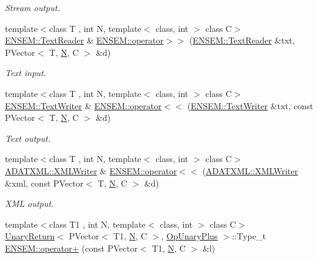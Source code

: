 \begin{DoxyCompactItemize}
\begin{DoxyCompactList}\small\item\em Stream output. \end{DoxyCompactList}\item 
{\footnotesize template$<$class T , int N, template$<$ class, int $>$ class C$>$ }\\\mbox{\hyperlink{classENSEM_1_1TextReader}{E\+N\+S\+E\+M\+::\+Text\+Reader}} \& \mbox{\hyperlink{group__primvector_gae8999766af04f54e1142ab8717a7f742}{E\+N\+S\+E\+M\+::operator$>$$>$}} (\mbox{\hyperlink{classENSEM_1_1TextReader}{E\+N\+S\+E\+M\+::\+Text\+Reader}} \&txt, P\+Vector$<$ T, \mbox{\hyperlink{adat__devel_2lib_2hadron_2operator__name__util_8cc_a7722c8ecbb62d99aee7ce68b1752f337}{N}}, C $>$ \&d)
\begin{DoxyCompactList}\small\item\em Text input. \end{DoxyCompactList}\item 
{\footnotesize template$<$class T , int N, template$<$ class, int $>$ class C$>$ }\\\mbox{\hyperlink{classENSEM_1_1TextWriter}{E\+N\+S\+E\+M\+::\+Text\+Writer}} \& \mbox{\hyperlink{group__primvector_gad4763d04d040319fe22a95ca0e2b8932}{E\+N\+S\+E\+M\+::operator$<$$<$}} (\mbox{\hyperlink{classENSEM_1_1TextWriter}{E\+N\+S\+E\+M\+::\+Text\+Writer}} \&txt, const P\+Vector$<$ T, \mbox{\hyperlink{adat__devel_2lib_2hadron_2operator__name__util_8cc_a7722c8ecbb62d99aee7ce68b1752f337}{N}}, C $>$ \&d)
\begin{DoxyCompactList}\small\item\em Text output. \end{DoxyCompactList}\item 
{\footnotesize template$<$class T , int N, template$<$ class, int $>$ class C$>$ }\\\mbox{\hyperlink{classADATXML_1_1XMLWriter}{A\+D\+A\+T\+X\+M\+L\+::\+X\+M\+L\+Writer}} \& \mbox{\hyperlink{group__primvector_ga5f643f72b00ff82d7abfb2a42401c045}{E\+N\+S\+E\+M\+::operator$<$$<$}} (\mbox{\hyperlink{classADATXML_1_1XMLWriter}{A\+D\+A\+T\+X\+M\+L\+::\+X\+M\+L\+Writer}} \&xml, const P\+Vector$<$ T, \mbox{\hyperlink{adat__devel_2lib_2hadron_2operator__name__util_8cc_a7722c8ecbb62d99aee7ce68b1752f337}{N}}, C $>$ \&d)
\begin{DoxyCompactList}\small\item\em X\+ML output. \end{DoxyCompactList}\item 
{\footnotesize template$<$class T1 , int N, template$<$ class, int $>$ class C$>$ }\\\mbox{\hyperlink{structUnaryReturn}{Unary\+Return}}$<$ P\+Vector$<$ T1, \mbox{\hyperlink{adat__devel_2lib_2hadron_2operator__name__util_8cc_a7722c8ecbb62d99aee7ce68b1752f337}{N}}, C $>$, \mbox{\hyperlink{structOpUnaryPlus}{Op\+Unary\+Plus}} $>$\+::Type\+\_\+t \mbox{\hyperlink{group__primvector_gadeef49e413dc749206be2cdd675cd802}{E\+N\+S\+E\+M\+::operator+}} (const P\+Vector$<$ T1, \mbox{\hyperlink{adat__devel_2lib_2hadron_2operator__name__util_8cc_a7722c8ecbb62d99aee7ce68b1752f337}{N}}, C $>$ \&l)

\end{DoxyCompactItemize}
